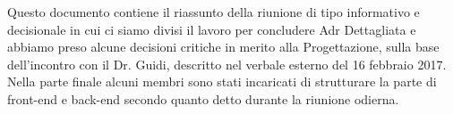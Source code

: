 Questo documento contiene il riassunto della riunione di tipo informativo e decisionale in cui ci siamo divisi il lavoro per concludere Adr Dettagliata e abbiamo preso alcune decisioni critiche in merito alla Progettazione, sulla base dell'incontro con il Dr. Guidi, descritto nel verbale esterno del 16 febbraio 2017.
Nella parte finale alcuni membri sono stati incaricati di strutturare la parte di front-end e back-end secondo quanto detto durante la riunione odierna.

